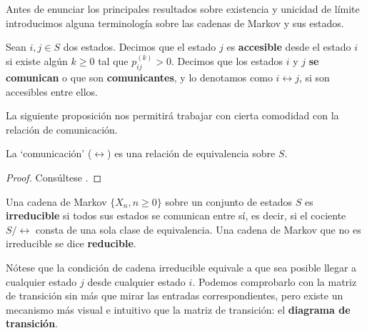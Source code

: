 Antes de enunciar los principales resultados sobre existencia y unicidad de límite introducimos alguna terminología sobre las cadenas de Markov y sus estados.

\begin{definicion}
    Sean $i,j\in S$ dos estados. Decimos que el estado $j$ es \textbf{accesible} desde el estado $i$ si existe algún $k\geq 0$ tal que $p_{ij}^{(k)}>0$. Decimos que los estados $i$ y $j$ \textbf{se comunican} o que son  \textbf{comunicantes}, y lo denotamos como $i\leftrightarrow j$, si son accesibles entre ellos.
\end{definicion}

La siguiente proposición nos permitirá trabajar con cierta comodidad con la relación de comunicación.

\begin{proposicion}
    La `comunicación' ($\leftrightarrow$) es una relación de equivalencia sobre $S$.
\end{proposicion}
\begin{proof}
    Consúltese \cite[Proposition 4.2.1]{Ross}.
\end{proof}

\begin{definicion}
    Una cadena de Markov $\{X_n,n\geq 0\}$ sobre un conjunto de estados $S$ es \textbf{irreducible} si todos sus estados se comunican entre sí, es decir, si el cociente $S/\leftrightarrow$ consta de una sola clase de equivalencia. Una cadena de Markov que no es irreducible se dice \textbf{reducible}.
\end{definicion}

Nótese que la condición de cadena irreducible equivale a que sea posible llegar a cualquier estado $j$ desde cualquier estado $i$. Podemos comprobarlo con la matriz de transición sin más que mirar las entradas correspondientes, pero existe un mecanismo más visual e intuitivo que la matriz de transición: el \textbf{diagrama de transición}.

